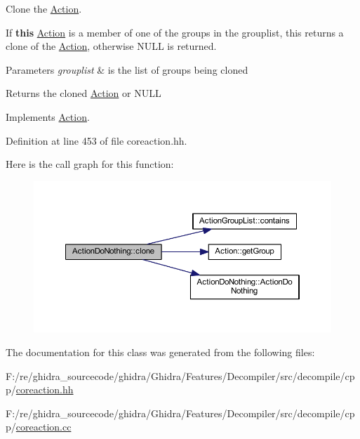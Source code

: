 Clone the \mbox{\hyperlink{class_action}{Action}}. 

If {\bfseries{this}} \mbox{\hyperlink{class_action}{Action}} is a member of one of the groups in the grouplist, this returns a clone of the \mbox{\hyperlink{class_action}{Action}}, otherwise N\+U\+LL is returned. 
\begin{DoxyParams}{Parameters}
{\em grouplist} & is the list of groups being cloned \\
\hline
\end{DoxyParams}
\begin{DoxyReturn}{Returns}
the cloned \mbox{\hyperlink{class_action}{Action}} or N\+U\+LL 
\end{DoxyReturn}


Implements \mbox{\hyperlink{class_action_af8242e41d09e5df52f97df9e65cc626f}{Action}}.



Definition at line 453 of file coreaction.\+hh.

Here is the call graph for this function\+:
\nopagebreak
\begin{figure}[H]
\begin{center}
\leavevmode
\includegraphics[width=350pt]{class_action_do_nothing_abe01dd8198e672a33f3a9fec28376284_cgraph}
\end{center}
\end{figure}


The documentation for this class was generated from the following files\+:\begin{DoxyCompactItemize}
\item 
F\+:/re/ghidra\+\_\+sourcecode/ghidra/\+Ghidra/\+Features/\+Decompiler/src/decompile/cpp/\mbox{\hyperlink{coreaction_8hh}{coreaction.\+hh}}\item 
F\+:/re/ghidra\+\_\+sourcecode/ghidra/\+Ghidra/\+Features/\+Decompiler/src/decompile/cpp/\mbox{\hyperlink{coreaction_8cc}{coreaction.\+cc}}\end{DoxyCompactItemize}
